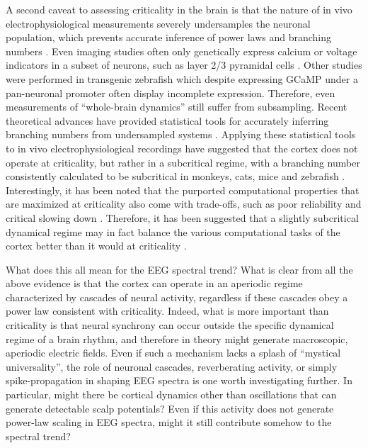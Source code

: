 A second caveat to assessing criticality in the brain is that the nature of in vivo electrophysiological measurements severely undersamples the neuronal population, which prevents accurate inference of power laws and branching numbers \cite{Priesemann2009}. Even imaging studies often only genetically express calcium or voltage indicators in a subset of neurons, such as layer 2/3 pyramidal cells \cite{Scott2014,Bellay2015}. Other studies were performed in transgenic zebrafish \cite{Ponce-Alvarez2018} which despite expressing GCaMP under a pan-neuronal promoter often display incomplete expression. Therefore, even measurements of ``whole-brain dynamics'' still suffer from subsampling. Recent theoretical advances have provided statistical tools for accurately inferring branching numbers from undersampled systems \cite{Wilting2018}. Applying these statistical tools to in vivo electrophysiological recordings have suggested that the cortex does not operate at criticality, but rather in a subcritical regime, with a branching number consistently calculated to be subcritical in monkeys, cats, mice \cite{Wilting2018,Wilting2019} and zebrafish \cite{Suryadi2022}. Interestingly, it has been noted that the purported computational properties that are maximized at criticality also come with trade-offs, such as poor reliability \cite{Gollo2017} and critical slowing down \cite{Scheffer2012, Wilting2019a}. Therefore, it has been suggested that a slightly subcritical dynamical regime may in fact balance the various computational tasks of the cortex better than it would at criticality \cite{Wilting2019a}.

What does this all mean for the EEG spectral trend? What is clear from all the above evidence is that the cortex can operate in an aperiodic regime characterized by cascades of neural activity, regardless if these cascades obey a power law consistent with criticality. Indeed, what is more important than criticality is that neural synchrony can occur outside the specific dynamical regime of a brain rhythm, and therefore in theory might generate macroscopic, aperiodic electric fields. Even if such a mechanism lacks a splash of ``mystical universality'', the role of neuronal cascades, reverberating activity, or simply spike-propagation in shaping EEG spectra is one worth investigating further. In particular, might there be cortical dynamics other than oscillations that can generate detectable scalp potentials? Even if this activity does not generate power-law scaling in EEG spectra, might it still contribute somehow to the spectral trend?

